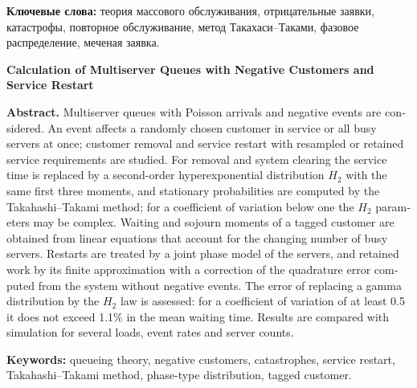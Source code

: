 \begin{abstract}
Рассматриваются многоканальные системы массового обслуживания с пуассоновскими поступлениями и отрицательными воздействиями. Воздействие затрагивает случайно выбранную обслуживаемую заявку либо все занятые каналы одновременно; исследуются удаление заявок и повторное обслуживание с новой или с первоначально выбранной длительностью. Для удаления и очищения системы длительность обслуживания заменяется гиперэкспоненциальным распределением второго порядка \(H_2\) с теми же первыми тремя моментами, и стационарные вероятности рассчитываются методом Такахаси--Таками; при коэффициенте вариации меньше единицы параметры \(H_2\) могут быть комплексными. Моменты времени ожидания и пребывания меченой заявки находятся из линейных уравнений с учётом изменения числа занятых каналов. Для повторов используется совместная фазовая модель каналов, для сохранённой работы -- её конечная аппроксимация с поправкой погрешности квадратуры по системе без воздействий. Оценена погрешность замены гамма-распределения законом \(H_2\): по среднему ожиданию она не превышает 1,1\% при коэффициенте вариации не менее 0,5. Результаты сопоставлены с имитационным моделированием для нескольких нагрузок, интенсивностей воздействий и чисел каналов.
\end{abstract}
\textbf{Ключевые слова:} теория массового обслуживания, отрицательные заявки, катастрофы, повторное обслуживание, метод Такахаси--Таками, фазовое распределение, меченая заявка.

\begin{otherlanguage}{english}
\bigskip
\begin{center}\textbf{Calculation of Multiserver Queues with Negative Customers and Service Restart}\end{center}
\textbf{Abstract.} Multiserver queues with Poisson arrivals and negative events are considered. An event affects a randomly chosen customer in service or all busy servers at once; customer removal and service restart with resampled or retained service requirements are studied. For removal and system clearing the service time is replaced by a second-order hyperexponential distribution \(H_2\) with the same first three moments, and stationary probabilities are computed by the Takahashi--Takami method; for a coefficient of variation below one the \(H_2\) parameters may be complex. Waiting and sojourn moments of a tagged customer are obtained from linear equations that account for the changing number of busy servers. Restarts are treated by a joint phase model of the servers, and retained work by its finite approximation with a correction of the quadrature error computed from the system without negative events. The error of replacing a gamma distribution by the \(H_2\) law is assessed: for a coefficient of variation of at least 0.5 it does not exceed 1.1\% in the mean waiting time. Results are compared with simulation for several loads, event rates and server counts.

\textbf{Keywords:} queueing theory, negative customers, catastrophes, service restart, Takahashi--Takami method, phase-type distribution, tagged customer.
\end{otherlanguage}


